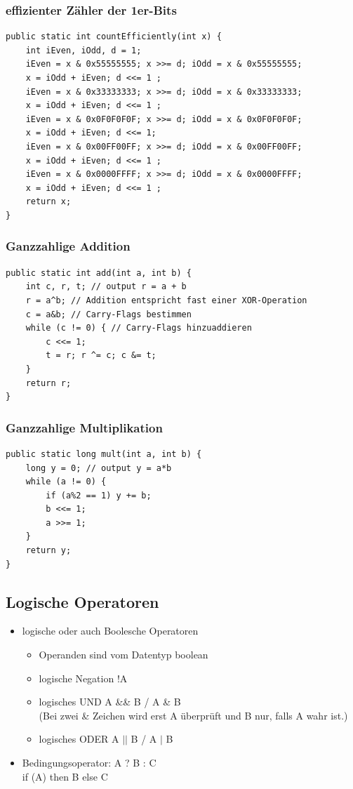 \documentclass[a4paper,10pt]{article}
\begin{document}
\subsubsection{effizienter Zähler der 1er-Bits}
\begin{lstlisting}
public static int countEfficiently(int x) {
	int iEven, iOdd, d = 1;
	iEven = x & 0x55555555; x >>= d; iOdd = x & 0x55555555; 
	x = iOdd + iEven; d <<= 1 ;
	iEven = x & 0x33333333; x >>= d; iOdd = x & 0x33333333; 
	x = iOdd + iEven; d <<= 1 ;	
	iEven = x & 0x0F0F0F0F; x >>= d; iOdd = x & 0x0F0F0F0F; 
	x = iOdd + iEven; d <<= 1;	
	iEven = x & 0x00FF00FF; x >>= d; iOdd = x & 0x00FF00FF; 
	x = iOdd + iEven; d <<= 1 ;
	iEven = x & 0x0000FFFF; x >>= d; iOdd = x & 0x0000FFFF; 
	x = iOdd + iEven; d <<= 1 ;	
	return x;
}
\end{lstlisting}

\subsubsection{Ganzzahlige Addition}
\begin{lstlisting}
public static int add(int a, int b) {
	int c, r, t; // output r = a + b
	r = a^b; // Addition entspricht fast einer XOR-Operation 
	c = a&b; // Carry-Flags bestimmen
	while (c != 0) { // Carry-Flags hinzuaddieren
		c <<= 1;
		t = r; r ^= c; c &= t;
	}
	return r;
}
\end{lstlisting}

\subsubsection{Ganzzahlige Multiplikation}
\begin{lstlisting}
public static long mult(int a, int b) {
	long y = 0; // output y = a*b
	while (a != 0) {
		if (a%2 == 1) y += b; 
		b <<= 1;
		a >>= 1;
	}
	return y;
}
\end{lstlisting}

\subsection{Logische Operatoren}

\begin{itemize}
	\item logische oder auch Boolesche Operatoren
		\begin{itemize}
			\item Operanden sind vom Datentyp boolean
			\item logische Negation !A
			\item logisches UND A \&\& B  / A \& B \\
				(Bei zwei \& Zeichen wird erst A überprüft und B nur, falls A wahr ist.)
			\item logisches ODER A $||$ B / A $|$ B
		\end{itemize}
	\item Bedingungsoperator: A ? B : C \\
		if (A) then B else C
\end{itemize}
\end{document}
